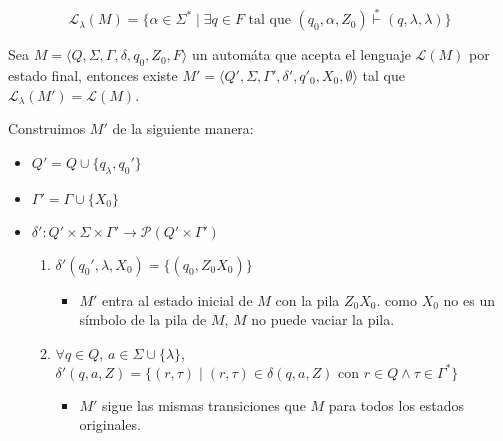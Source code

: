 \[ \mathcal{L}_\lambda(M) = \{ \alpha \in \Sigma^* \mid \exists q \in F \text{ tal que } (q_0, \alpha, Z_0) \overset{*}{\vdash}  (q, \lambda, \lambda) \} \]


\begin{teorema}
  \label{teo:automata-pila}
  Sea \(M=\langle Q, \Sigma, \Gamma, \delta, q_0, Z_0, F \rangle\) un automáta que acepta el lenguaje \(\mathcal{L}(M)\) por estado final, entonces existe \(M'=\langle Q', \Sigma, \Gamma', \delta', q'_0, X_0, \emptyset \rangle\) tal que \(\mathcal{L}_\lambda(M') = \mathcal{L}(M)\).
\end{teorema}
\begin{demo}[0.8\textwidth]
  Construimos \(M'\) de la siguiente manera:
  \begin{itemize}
    \item \(Q' = Q \cup \{q_\lambda, q_0'\}\)
    \item \(\Gamma' = \Gamma \cup \{ X_0 \}\)
    \item \(\delta': Q'\times\Sigma\times\Gamma' \rightarrow \mathcal{P}(Q'\times\Gamma')\)
          \begin{enumerate}
            \item\(\delta'(q_0', \lambda, X_0) = \{ (q_0, Z_0X_0) \}\)
            \begin{itemize}
              \item[] \(M'\) entra al estado inicial de \(M\) con la pila \(Z_0X_0\). como \(X_0\) no es un símbolo de la pila de \(M\), \(M\) no puede vaciar la pila.
            \end{itemize}
            \item  \(\forall q\in Q\), \(a\in\Sigma\cup\{\lambda\}\),   \( \delta'(q, a, Z) = \{ (r, \tau) \mid (r, \tau) \in \delta(q, a, Z) \text{ con } r\in Q\land \tau\in\Gamma^* \} \)
                  \begin{itemize}
                    \item[] \(M'\) sigue las mismas transiciones que \(M\) para todos los estados originales.
                  \end{itemize}
          \end{enumerate}
  \end{itemize}
\end{demo}
